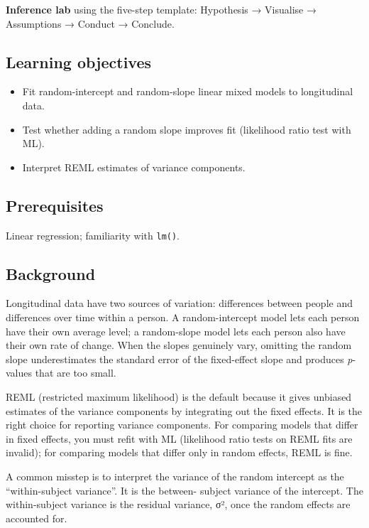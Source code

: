 \documentclass[
]{article}
\author{}
\date{\vspace{-2.5em}}
\providecommand{\tightlist}{%
  \setlength{\itemsep}{0pt}\setlength{\parskip}{0pt}}
\begin{document}
\textbf{Inference lab} using the five-step template: Hypothesis →
Visualise → Assumptions → Conduct → Conclude.

\subsection{Learning objectives}\label{learning-objectives}

\begin{itemize}
\tightlist
\item
  Fit random-intercept and random-slope linear mixed models to
  longitudinal data.
\item
  Test whether adding a random slope improves fit (likelihood ratio test
  with ML).
\item
  Interpret REML estimates of variance components.
\end{itemize}

\subsection{Prerequisites}\label{prerequisites}

Linear regression; familiarity with \texttt{lm()}.

\subsection{Background}\label{background}

Longitudinal data have two sources of variation: differences between
people and differences over time within a person. A random-intercept
model lets each person have their own average level; a random-slope
model lets each person also have their own rate of change. When the
slopes genuinely vary, omitting the random slope underestimates the
standard error of the fixed-effect slope and produces \emph{p}-values
that are too small.

REML (restricted maximum likelihood) is the default because it gives
unbiased estimates of the variance components by integrating out the
fixed effects. It is the right choice for reporting variance components.
For comparing models that differ in fixed effects, you must refit with
ML (likelihood ratio tests on REML fits are invalid); for comparing
models that differ only in random effects, REML is fine.

A common misstep is to interpret the variance of the random intercept as
the ``within-subject variance''. It is the between- subject variance of
the intercept. The within-subject variance is the residual variance, σ²,
once the random effects are accounted for.
\end{document}
